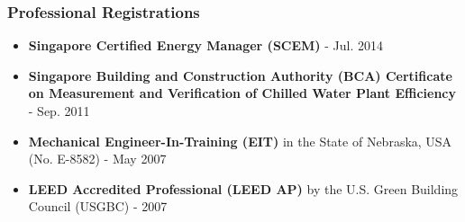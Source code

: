 \documentclass[10pt,a4paper]{article}
\begin{document}
\begin{small}
\begin{itemize}
\end{itemize}

\subsubsection*{Professional Registrations}
\begin{itemize}
    \item \textbf{Singapore Certified Energy Manager (SCEM)} - Jul. 2014 
    \item \textbf{Singapore Building and Construction Authority (BCA) Certificate on Measurement and Verification of Chilled Water Plant Efficiency} - Sep. 2011
    \item \textbf{Mechanical Engineer-In-Training (EIT)} in the State of Nebraska, USA (No. E-8582) - May 2007
    \item \textbf{LEED Accredited Professional (LEED AP)} by the U.S. Green Building Council (USGBC) - 2007
\end{itemize}



\end{small}
\end{document}

